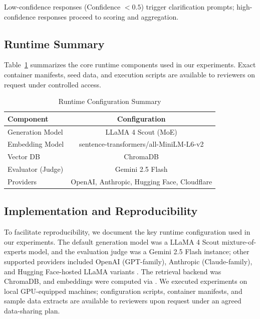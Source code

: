 \documentclass[sigconf]{acmart}
\begin{document}
Low-confidence responses (Confidence $<0.5$) trigger clarification prompts; high-confidence responses proceed to scoring and aggregation.

\subsection{Runtime Summary}

Table~\ref{tab:runtime} summarizes the core runtime components used in our experiments. Exact container manifests, seed data, and execution scripts are available to reviewers on request under controlled access.

\begin{table}[htbp]
\caption{Runtime Configuration Summary}
\label{tab:runtime}
\begin{center}
\begin{tabular}{lc}
\toprule
Component & Configuration \\
\midrule
Generation Model & LLaMA 4 Scout (MoE) \\
Embedding Model & sentence-transformers/all-MiniLM-L6-v2 \\
Vector DB & ChromaDB \\
Evaluator (Judge) & Gemini 2.5 Flash \\
Providers & OpenAI, Anthropic, Hugging Face, Cloudflare \\
\bottomrule
\end{tabular}
\end{center}
\end{table}\subsection{Implementation and Reproducibility}

To facilitate reproducibility, we document the key runtime configuration used in our experiments. The default generation model was a LLaMA 4 Scout mixture-of-experts model, and the evaluation judge was a Gemini 2.5 Flash instance; other supported providers included OpenAI (GPT-family), Anthropic (Claude-family), and Hugging Face-hosted LLaMA variants \cite{meta2025,openai2023}. The retrieval backend was ChromaDB, and embeddings were computed via \texttt{} \cite{huggingface2023,chroma2023}. We executed experiments on local GPU-equipped machines; configuration scripts, container manifests, and sample data extracts are available to reviewers upon request under an agreed data-sharing plan.
\end{document}
